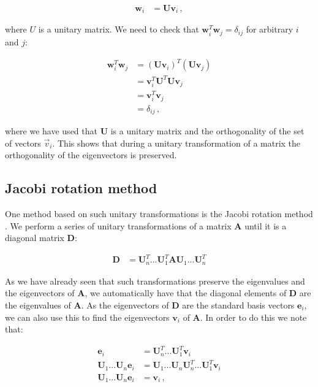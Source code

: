 \documentclass[reprint,english,notitlepage]{revtex4-1}  %
\begin{document}
\begin{align*}
\textbf{w}_i &= \textbf{U} \textbf{v}_i \, ,
\end{align*}

where $U$ is a unitary matrix. We need to check that $\textbf{w}_i^T \textbf{w}_j = \delta_{ij}$ for arbitrary $i$ and $j$:

\begin{align*}
\textbf{w}_i^T \textbf{w}_j &= (\textbf{U}\textbf{v}_i)^T (\textbf{U}\textbf{v}_j) \\
&= \textbf{v}_i^T \textbf{U}^T \textbf{U} \textbf{v}_j \\
&= \textbf{v}_i^T \textbf{v}_j \\
&= \delta_{ij} \, ,
\end{align*}

where we have used that $\textbf{U}$ is a unitary matrix and the orthogonality of the set of vectors $\vec{v}_i$. This shows that during a unitary transformation of a matrix the orthogonality of the eigenvectors is preserved. 


\subsection{Jacobi rotation method} \label{sec:II:b}

One method based on such unitary transformations is the Jacobi rotation method \citep{Jacobi1846}. We perform a series of unitary transformations of a matrix \textbf{A} until it is a diagonal matrix \textbf{D}:

\begin{align*}
\textbf{D} &= \textbf{U}_n^T ... \textbf{U}_1^T \textbf{AU}_1 ... \textbf{U}_n^T
\end{align*}  

As we have already seen that such transformations preserve the eigenvalues and the eigenvectors of \textbf{A}, we automatically have that the diagonal elements of \textbf{D} are the eigenvalues of \textbf{A}. As the eigenvectors of \textbf{D} are the standard basis vectors $\textbf{e}_i$, we can also use this to find the eigenvectors $\textbf{v}_i$ of \textbf{A}. In order to do this we note that:

\begin{align*}
\textbf{e}_i &= \textbf{U}_n^T ... \textbf{U}_1^T \textbf{v}_i \\
\textbf{U}_1 ... \textbf{U}_n \textbf{e}_i &= \textbf{U}_1 ... \textbf{U}_n \textbf{U}_n^T ... \textbf{U}_1^T \textbf{v}_i \\
\textbf{U}_1 ... \textbf{U}_n \textbf{e}_i &= \textbf{v}_i \, ,
\end{align*}
\end{document}
